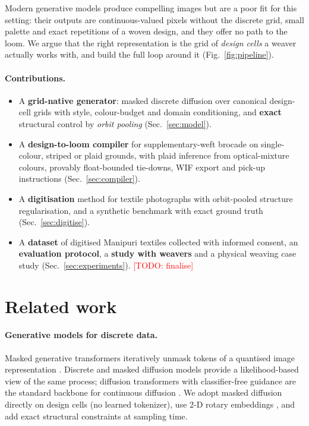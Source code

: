 \documentclass[11pt]{article}
\newcommand{\todo}[1]{\textcolor{red}{[TODO: #1]}}
\begin{document}
Modern generative models produce compelling images but are a poor fit for this setting: their
outputs are continuous-valued pixels without the discrete grid, small palette and exact
repetitions of a woven design, and they offer no path to the loom. We argue that the right
representation is the grid of \emph{design cells} a weaver actually works with, and build the full
loop around it (Fig.~\ref{fig:pipeline}).

\paragraph{Contributions.}
\begin{itemize}
  \item A \textbf{grid-native generator}: masked discrete diffusion over canonical design-cell grids
        with style, colour-budget and domain conditioning, and \textbf{exact} structural control by
        \emph{orbit pooling} (Sec.~\ref{sec:model}).
  \item A \textbf{design-to-loom compiler} for supplementary-weft brocade on single-colour, striped or
        plaid grounds, with plaid inference from optical-mixture colours, provably float-bounded
        tie-downs, WIF export and pick-up instructions (Sec.~\ref{sec:compiler}).
  \item A \textbf{digitisation} method for textile photographs with orbit-pooled structure
        regularisation, and a synthetic benchmark with exact ground truth (Sec.~\ref{sec:digitise}).
  \item A \textbf{dataset} of digitised Manipuri textiles collected with informed consent, an
        \textbf{evaluation protocol}, a \textbf{study with weavers} and a physical weaving case study
        (Sec.~\ref{sec:experiments}). \todo{finalise}
\end{itemize}

\section{Related work}

\paragraph{Generative models for discrete data.}
Masked generative transformers \cite{chang2022maskgit} iteratively unmask tokens of a quantised
image representation \cite{esser2021taming}. Discrete and masked diffusion models
\cite{austin2021structured,sahoo2024simple,shi2024simplified} provide a likelihood-based view of the
same process; diffusion transformers \cite{peebles2023scalable} with classifier-free guidance
\cite{ho2022classifier} are the standard backbone for continuous diffusion
\cite{ho2020denoising,rombach2022high}. We adopt masked diffusion directly on design cells (no
learned tokenizer), use 2-D rotary embeddings \cite{su2024roformer}, and add exact structural
constraints at sampling time.
\end{document}
